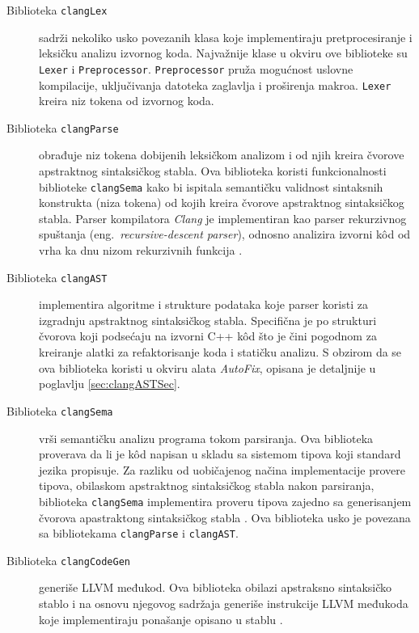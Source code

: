 \documentclass[12pt,oneside]{memoir}
\begin{document}
\begin{description}
  \item[Biblioteka \texttt{clangLex}] sadr\v{z}i nekoliko usko povezanih klasa koje implementiraju pretprocesiranje i leksi\v{c}ku analizu izvornog koda. Najva\v{z}nije klase u okviru ove biblioteke
       su \texttt{Lexer} i  \texttt{Preprocessor}.
       \texttt{Preprocessor} pru\v{z}a mogućnost uslovne kompilacije, uključivanja datoteka zaglavlja i proširenja makroa.
       \texttt{Lexer} kreira niz tokena od izvornog koda.
  \item[Biblioteka \texttt{clangParse}]
        obrađuje niz tokena dobijenih leksi\v{c}kom analizom i od njih kreira \v{c}vorove apstraktnog sintaksi\v{c}kog stabla. Ova biblioteka koristi funkcionalnosti 
        biblioteke \texttt{clangSema} kako bi ispitala semanti\v{c}ku validnost sintaksnih konstrukta (niza tokena) od kojih kreira \v{c}vorove apstraktnog sintaksi\v{c}kog stabla.
        Parser kompilatora \textit{Clang} je implementiran kao parser rekurzivnog spuštanja (eng.~\textit{recursive-descent parser}), odnosno analizira izvorni k\^{o}d od vrha ka dnu nizom rekurzivnih funkcija \cite{LLVMCoreLibraries}.
  \item[Biblioteka \texttt{clangAST}]
        implementira algoritme i strukture podataka koje parser koristi za izgradnju apstraktnog sintaksi\v{c}kog stabla. Specifična je po strukturi čvorova koji podsećaju na izvorni C++ k\^{o}d što je čini pogodnom za kreiranje alatki za refaktorisanje koda i statičku analizu. S obzirom da se ova biblioteka koristi u okviru alata \textit{AutoFix}, opisana je detaljnije u poglavlju \ref{sec:clangASTSec}.
  \item[Biblioteka \texttt{clangSema}]
        vrši semantičku analizu programa tokom parsiranja. Ova biblioteka proverava da li je k\^{o}d napisan u skladu sa sistemom tipova koji standard jezika propisuje. Za razliku od uobi\v{c}ajenog na\v{c}ina implementacije provere tipova, obilaskom apstraktnog sintaksi\v{c}kog stabla nakon parsiranja, biblioteka \texttt{clangSema} implementira proveru tipova zajedno sa generisanjem \v{c}vorova apastraktong sintaksi\v{c}kog stabla \cite{LLVMCoreLibraries}. Ova biblioteka usko je povezana sa bibliotekama \texttt{clangParse} i \texttt{clangAST}.
  \item[Biblioteka \texttt{clangCodeGen}]
        generiše LLVM međukod. Ova biblioteka obilazi apstraksno sintaksi\v{c}ko stablo i na osnovu njegovog sadr\v{z}aja generi\v{s}e instrukcije
        LLVM međukoda koje implementiraju pona\v{s}anje opisano u stablu \cite{LLVMCoreLibraries}.
\end{description}
\end{document}
